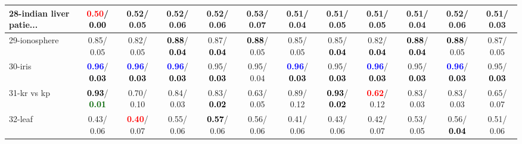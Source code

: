 \begin{table}[h]
\begin{center}
{\begin{tabular}{lc|c|c|c|c|c|c|c|c|c|c}
28-indian liver patie... & \textcolor{red}{\textbf{  0.50}}/\textcolor{black}{\textbf{  0.00}} &   0.52/  0.05 &   0.52/  0.06 &   0.52/  0.06 &   0.53/  0.07 &   0.51/  0.04 &   0.51/  0.05 &   0.51/  0.05 &   0.51/  0.04 &   0.52/  0.06 &   0.51/  0.03 \\ \hline
29-ionosphere &   0.85/  0.05 &   0.82/  0.05 & \textcolor{black}{\textbf{  0.88}}/\textcolor{black}{\textbf{  0.04}} &   0.87/\textcolor{black}{\textbf{  0.04}} & \textcolor{black}{\textbf{  0.88}}/  0.05 &   0.85/  0.05 &   0.85/\textcolor{black}{\textbf{  0.04}} &   0.82/\textcolor{black}{\textbf{  0.04}} & \textcolor{black}{\textbf{  0.88}}/\textcolor{black}{\textbf{  0.04}} & \textcolor{black}{\textbf{  0.88}}/  0.05 &   0.87/  0.05 \\
30-iris & \textcolor{blue}{\textbf{  0.96}}/\textcolor{black}{\textbf{  0.03}} & \textcolor{blue}{\textbf{  0.96}}/\textcolor{black}{\textbf{  0.03}} & \textcolor{blue}{\textbf{  0.96}}/\textcolor{black}{\textbf{  0.03}} &   0.95/\textcolor{black}{\textbf{  0.03}} &   0.95/  0.04 & \textcolor{blue}{\textbf{  0.96}}/\textcolor{black}{\textbf{  0.03}} &   0.95/\textcolor{black}{\textbf{  0.03}} & \textcolor{blue}{\textbf{  0.96}}/\textcolor{black}{\textbf{  0.03}} &   0.95/\textcolor{black}{\textbf{  0.03}} & \textcolor{blue}{\textbf{  0.96}}/\textcolor{black}{\textbf{  0.03}} &   0.95/\textcolor{black}{\textbf{  0.03}} \\
31-kr vs kp & \textcolor{black}{\textbf{  0.93}}/\textcolor{darkgreen}{\textbf{  0.01}} &   0.70/  0.10 &   0.84/  0.03 &   0.83/\textcolor{black}{\textbf{  0.02}} &   0.63/  0.05 &   0.89/  0.12 & \textcolor{black}{\textbf{  0.93}}/\textcolor{black}{\textbf{  0.02}} & \textcolor{red}{\textbf{  0.62}}/  0.12 &   0.83/  0.03 &   0.83/  0.03 &   0.65/  0.07 \\
32-leaf &   0.43/  0.06 & \textcolor{red}{\textbf{  0.40}}/  0.07 &   0.55/  0.06 & \textcolor{black}{\textbf{  0.57}}/  0.06 &   0.56/  0.06 &   0.41/  0.06 &   0.43/  0.06 &   0.42/  0.07 &   0.53/  0.05 &   0.56/\textcolor{black}{\textbf{  0.04}} &   0.51/  0.06 \\\end{tabular}}\label{stratsBalAcc0bVFDT}
\end{center}
\end{table}
